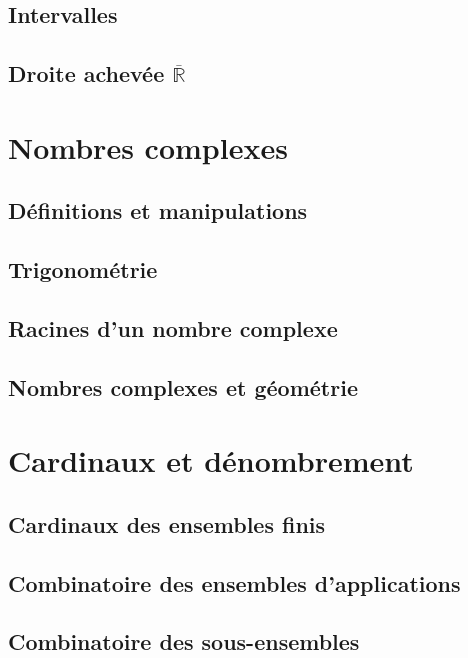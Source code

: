 \documentclass[11pt,twoside,a4paper]{article}
\begin{document}
\subsection{Intervalles}

\subsection{Droite achevée $\overline{\mathbb{R}}$}

\newpage
\section{Nombres complexes}

\subsection{Définitions et manipulations}

\subsection{Trigonométrie}

\subsection{Racines d'un nombre complexe}

\subsection{Nombres complexes et géométrie}

\newpage
\section{Cardinaux et dénombrement}

\subsection{Cardinaux des ensembles finis}

\subsection{Combinatoire des ensembles d'applications}

\subsection{Combinatoire des sous-ensembles}
\end{document}
